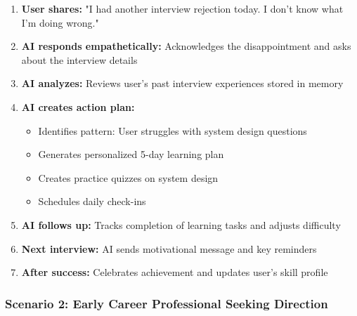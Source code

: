 \documentclass[12pt,a4paper]{article}
\begin{document}
\begin{enumerate}[leftmargin=*]
    \item \textbf{User shares:} "I had another interview rejection today. I don't know what I'm doing wrong."
    
    \item \textbf{AI responds empathetically:} Acknowledges the disappointment and asks about the interview details
    
    \item \textbf{AI analyzes:} Reviews user's past interview experiences stored in memory
    
    \item \textbf{AI creates action plan:}
    \begin{itemize}
        \item Identifies pattern: User struggles with system design questions
        \item Generates personalized 5-day learning plan
        \item Creates practice quizzes on system design
        \item Schedules daily check-ins
    \end{itemize}
    
    \item \textbf{AI follows up:} Tracks completion of learning tasks and adjusts difficulty
    
    \item \textbf{Next interview:} AI sends motivational message and key reminders
    
    \item \textbf{After success:} Celebrates achievement and updates user's skill profile
\end{enumerate}

\subsubsection{Scenario 2: Early Career Professional Seeking Direction}
\end{document}
